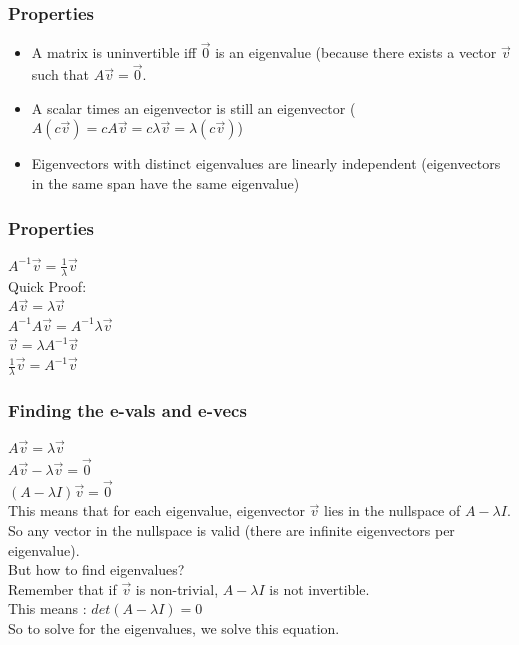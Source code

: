 \documentclass{beamer}
\begin{document}
\begin{frame}
\frametitle{Properties}
\begin{itemize}
\item A matrix is uninvertible iff $\vec{0}$ is an eigenvalue (because there exists a vector $\vec{v}$ such that $A\vec{v} = \vec{0}$.
\item A scalar times an eigenvector is still an eigenvector ($A(c\vec{v}) = cA\vec{v} = c\lambda\vec{v} = \lambda(c\vec{v})$)
\item Eigenvectors with distinct eigenvalues are linearly independent (eigenvectors in the same span have the same eigenvalue)
\end{itemize}


\end{frame}

\begin{frame}
\frametitle{Properties}
{\huge $A^{-1}\vec{v} = \frac{1}{\lambda}\vec{v}$} \\
\vspace{15pt}
Quick Proof: \\
$A\vec{v} = \lambda\vec{v}$ \\
$A^{-1}A\vec{v} = A^{-1}\lambda\vec{v}$ \\
$\vec{v} = \lambda A^{-1}\vec{v}$ \\
$\frac{1}{\lambda}\vec{v} = A^{-1}\vec{v}$

\end{frame}

\begin{frame}
\frametitle{Finding the e-vals and e-vecs}
$A\vec{v} = \lambda\vec{v}$ \\
$A\vec{v} - \lambda\vec{v} = \vec{0}$ \\
$(A-\lambda I)\vec{v} = \vec{0}$ \\
This means that for each eigenvalue, eigenvector $\vec{v}$ lies in the nullspace of $A-\lambda I$. \\
So any vector in the nullspace is valid (there are infinite eigenvectors per eigenvalue). \\
But how to find eigenvalues? \\
Remember that if $\vec{v}$ is non-trivial, $A-\lambda I$ is not invertible. \\
This means : $det(A - \lambda I) = 0$ \\
So to solve for the eigenvalues, we solve this equation.



\end{frame}
\end{document}
